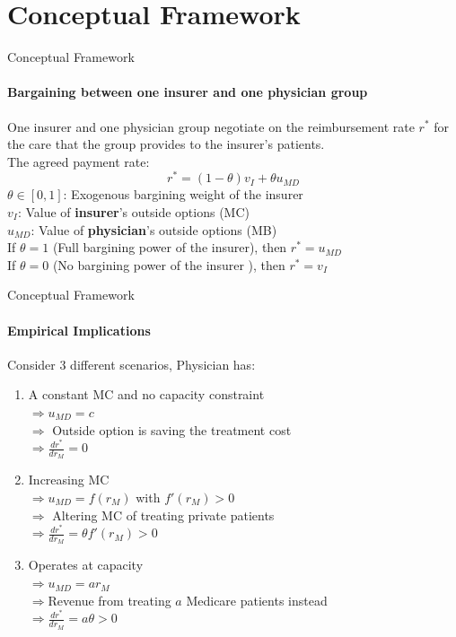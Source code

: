 \documentclass{beamer}
\begin{document}
\section{Conceptual Framework}
\begin{frame}{Conceptual Framework}
\framesubtitle{Bargaining between one insurer and one physician group}
One insurer and one physician group negotiate on the reimbursement rate $r^*$ for the care that the group provides to the insurer's patients.\\
\hfill \break
The agreed payment rate:
$$r^* = (1-\theta)v_I + \theta u_{MD}$$
$\theta \in [0,1]$: Exogenous bargining weight of the insurer\\
$v_I$: Value of  \textbf{insurer}'s outside options (MC) \\
$u_{MD}$: Value of \textbf{physician}'s outside options (MB)\\
\hfill \break
If $\theta = 1$ (Full bargining power of the insurer), then $r^* = u_{MD}$\\
If $\theta = 0$ (No bargining power of the insurer ), then $r^* = v_I$
\end{frame}

\begin{frame}{Conceptual Framework}
\framesubtitle{Empirical Implications}
Consider 3 different scenarios, Physician has:
\begin{enumerate}
\item A constant MC and no capacity constraint \\
$\Rightarrow u_{MD} = c$\\
$\Rightarrow$ Outside option is saving the treatment cost\\
$\Rightarrow \frac{dr^*}{dr_M} = 0$
\hfill \break
\item Increasing MC\\
$\Rightarrow u_{MD} = f(r_M)$ with $f'(r_M)>0$\\
$\Rightarrow$ Altering MC of treating private patients\\
 $\Rightarrow \frac{dr^*}{dr_M} = \theta f'(r_M) >0$
\hfill \break
\item Operates at capacity\\
$\Rightarrow u_{MD} = ar_M$\\
$\Rightarrow$Revenue from treating $a$ Medicare patients instead \\
$\Rightarrow \frac{dr^*}{dr_M} =a \theta >0$
\end{enumerate}
\end{frame}
\end{document}
